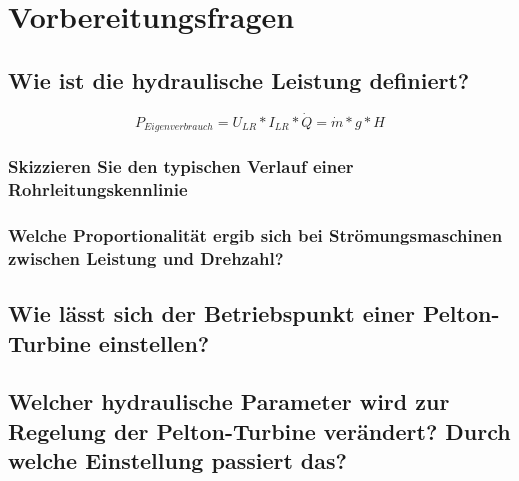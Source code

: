 \section{Vorbereitungsfragen}
\subsection{Wie ist die hydraulische Leistung definiert?}
%
\begin{equation}
	P_{ Eigenverbrauch }= U_{ LR} * I_{ LR }* \dot Q = \dot m * g* H
\label{eq:2}
\end{equation}
%
\subsubsection{Skizzieren Sie den typischen Verlauf einer Rohrleitungskennlinie}
\subsubsection{Welche Proportionalität ergib sich bei Strömungsmaschinen zwischen Leistung und Drehzahl?}
\subsection{Wie lässt sich der Betriebspunkt einer Pelton-Turbine einstellen?}
\subsection{Welcher hydraulische Parameter wird zur Regelung der Pelton-Turbine verändert?
Durch welche Einstellung passiert das? }